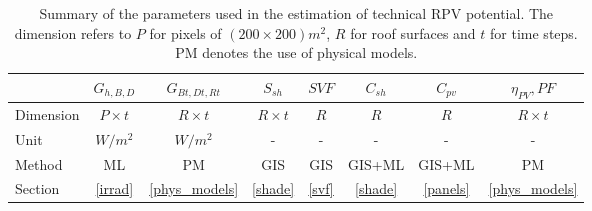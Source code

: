 \begin{table}[tb]
\centering
\footnotesize
\caption{Summary of the parameters used in the estimation of technical RPV potential. The dimension refers to $P$ for pixels of $(200 \times 200)m^2$, $R$ for roof surfaces and $t$ for time steps. PM denotes the use of physical models.}
\label{tab:vars}
\begin{tabular} {lccccccc} %
\hline 
  & $G_{h,B,D}$ & $G_{Bt,Dt,Rt}$ & $S_{sh}$   & $SVF$  & $C_{sh}$  & $C_{pv}$ & $\eta_{PV}, PF$     
  \\
\hline 
Dimension & $P \times t$ & $R \times t$ & $R \times t$ & $R$   & $R$     & $R$      & $R \times t$  
\\
Unit     & $W/m^2$    & $W/m^2$  & -                          & -                  & -                    & -                     & -                             
\\
Method      & ML & PM & GIS & GIS & GIS+ML & GIS+ML & PM \\
Section      & \ref{irrad}  & \ref{phys_models}     & \ref{shade}       & \ref{svf} & \ref{shade} & \ref{panels} & \ref{phys_models} 
\\  
\hline 
\end{tabular}
\end{table}

